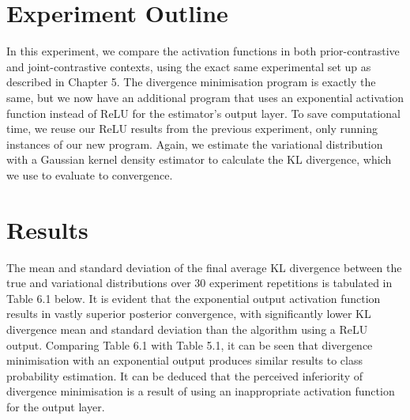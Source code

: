 \documentclass[honours,12pt]{unswthesis}
\numberwithin{equation}{section}
\theoremstyle{definition}
\begin{document}
\section{Experiment Outline}
In this experiment, we compare the activation functions in both prior-contrastive and joint-contrastive contexts, using the exact same experimental set up as described in Chapter 5. The divergence minimisation program is exactly the same, but we now have an additional program that uses an exponential activation function instead of ReLU for the estimator's output layer. To save computational time, we reuse our ReLU results from the previous experiment, only running instances of our new program. Again, we estimate the variational distribution with a Gaussian kernel density estimator to calculate the KL divergence, which we use to evaluate to convergence.
\section{Results}
The mean and standard deviation of the final average KL divergence between the true and variational distributions over 30 experiment repetitions is tabulated in Table 6.1 below. It is evident that the exponential output activation function results in vastly superior posterior convergence, with significantly lower KL divergence mean and standard deviation than the algorithm using a ReLU output. Comparing Table 6.1 with Table 5.1, it can be seen that divergence minimisation with an exponential output produces similar results to class probability estimation. It can be deduced that the perceived inferiority of divergence minimisation is a result of using an inappropriate activation function for the output layer.
\end{document}
